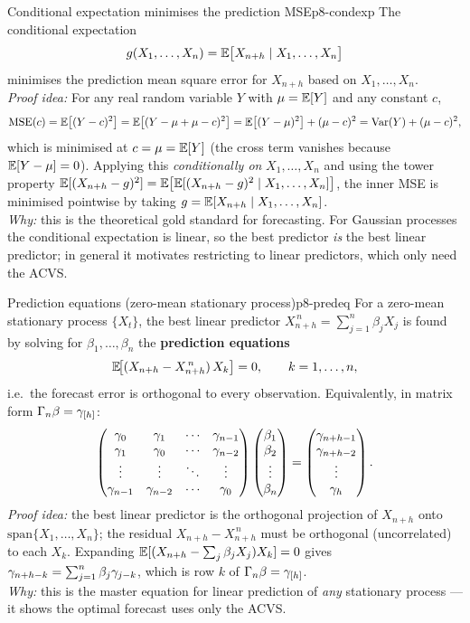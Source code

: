 \begin{lemma}{Conditional expectation minimises the prediction MSE}{p8-condexp}
The conditional expectation
\[
g(X_1,\dots,X_n)=\mathbb{E}\big[X_{n+h}\mid X_1,\dots,X_n\big]
\]
minimises the prediction mean square error for $X_{n+h}$ based on
$X_1,\dots,X_n$.\\[3pt]
\textit{Proof idea:} For any real random variable $Y$ with $\mu=\mathbb{E}[Y]$ and any
constant $c$,
\[
\operatorname{MSE}(c)=\mathbb{E}\big[(Y-c)^2\big]=\mathbb{E}\big[(Y-\mu+\mu-c)^2\big]
=\mathbb{E}\big[(Y-\mu)^2\big]+(\mu-c)^2=\operatorname{Var}(Y)+(\mu-c)^2,
\]
which is minimised at $c=\mu=\mathbb{E}[Y]$ (the cross term vanishes because
$\mathbb{E}[Y-\mu]=0$). Applying this \emph{conditionally on} $X_1,\dots,X_n$ and using
the tower property
$\mathbb{E}[(X_{n+h}-g)^2]=\mathbb{E}\big[\mathbb{E}[(X_{n+h}-g)^2\mid X_1,\dots,X_n]\big]$, the inner
MSE is minimised pointwise by taking $g=\mathbb{E}[X_{n+h}\mid X_1,\dots,X_n]$.\\[2pt]
\textit{Why:} this is the theoretical gold standard for forecasting. For
Gaussian processes the conditional expectation is linear, so the best predictor
\emph{is} the best linear predictor; in general it motivates restricting to
linear predictors, which only need the ACVS.
\end{lemma}

\begin{theorem}{Prediction equations (zero-mean stationary process)}{p8-predeq}
For a zero-mean stationary process $\{X_t\}$, the best linear predictor
$X^{\,n}_{n+h}=\sum_{j=1}^n\beta_j X_j$ is found by solving for
$\beta_1,\dots,\beta_n$ the \textbf{prediction equations}
\[
\mathbb{E}\!\big[(X_{n+h}-X^{\,n}_{n+h})\,X_k\big]=0,\qquad k=1,\dots,n,
\]
i.e.\ the forecast error is orthogonal to every observation. Equivalently, in
matrix form $\Gamma_n\beta=\gamma_{[h]}$:
\[
\begin{pmatrix}
\gamma_0 & \gamma_1 & \cdots & \gamma_{n-1}\\
\gamma_1 & \gamma_0 & \cdots & \gamma_{n-2}\\
\vdots & \vdots & \ddots & \vdots\\
\gamma_{n-1} & \gamma_{n-2} & \cdots & \gamma_0
\end{pmatrix}
\begin{pmatrix}\beta_1\\ \beta_2\\ \vdots\\ \beta_n\end{pmatrix}
=\begin{pmatrix}\gamma_{n+h-1}\\ \gamma_{n+h-2}\\ \vdots\\ \gamma_{h}\end{pmatrix}.
\]
\textit{Proof idea:} the best linear predictor is the orthogonal projection of
$X_{n+h}$ onto $\mathrm{span}\{X_1,\dots,X_n\}$; the residual
$X_{n+h}-X^{\,n}_{n+h}$ must be orthogonal (uncorrelated) to each $X_k$.
Expanding $\mathbb{E}[(X_{n+h}-\sum_j\beta_jX_j)X_k]=0$ gives
$\gamma_{n+h-k}=\sum_{j=1}^n\beta_j\gamma_{j-k}$, which is row $k$ of
$\Gamma_n\beta=\gamma_{[h]}$.\\[2pt]
\textit{Why:} this is the master equation for linear prediction of \emph{any}
stationary process --- it shows the optimal forecast uses only the ACVS.
\end{theorem}

